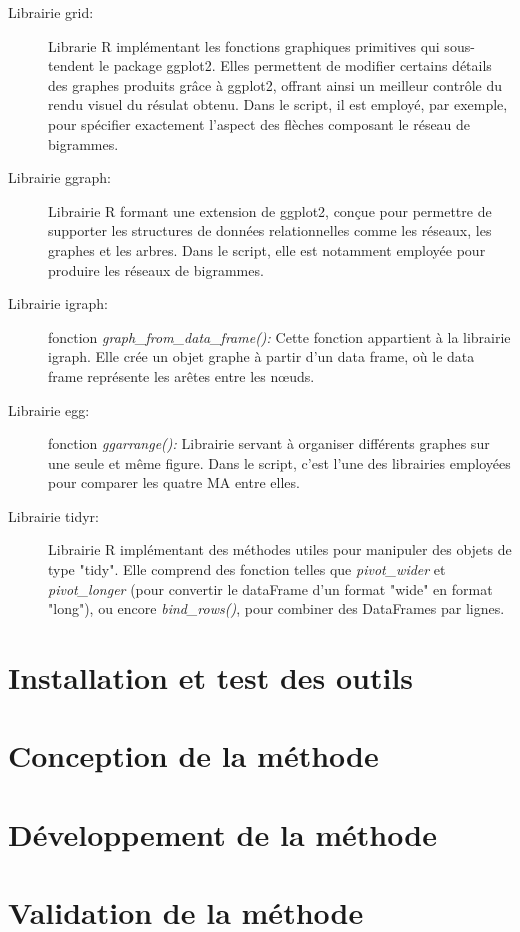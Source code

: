 \documentclass{book}
\begin{document}
\begin{description}
    \item[Librairie grid:] Librarie R implémentant les fonctions graphiques primitives qui sous-tendent le package ggplot2. Elles permettent de modifier certains détails des graphes produits grâce à ggplot2, offrant ainsi un meilleur contrôle du rendu visuel du résulat obtenu. Dans le script, il est employé, par exemple, pour spécifier exactement l'aspect des flèches composant le réseau de bigrammes. 
    \item[Librairie ggraph:] Librairie R formant une extension de ggplot2, conçue pour permettre de supporter les structures de données relationnelles comme les réseaux, les graphes et les arbres. Dans le script, elle est notamment employée pour produire les réseaux de bigrammes.
    \item[Librairie igraph:] fonction \textit{graph\_from\_data\_frame():} Cette fonction appartient à la librairie igraph. Elle crée un objet graphe à partir d'un data frame, où le data frame représente les arêtes entre les nœuds.
    \item[Librairie egg:] fonction \textit{ggarrange():} Librairie servant à organiser différents graphes sur une seule et même figure. Dans le script, c'est l'une des librairies employées pour comparer les quatre MA entre elles.
    \item[Librairie tidyr:] Librairie R implémentant des méthodes utiles pour manipuler des objets de type "tidy". Elle comprend des fonction telles que \textit{pivot\_wider} et \textit{pivot\_longer} (pour convertir le dataFrame d'un format "wide" en format "long"), ou encore \textit{bind\_rows()}, pour combiner des DataFrames par lignes.
\end{description}
\noindent

\section{Installation et test des outils}

\section{Conception de la méthode}

\section{Développement de la méthode}

\section{Validation de la méthode}
\end{document}
